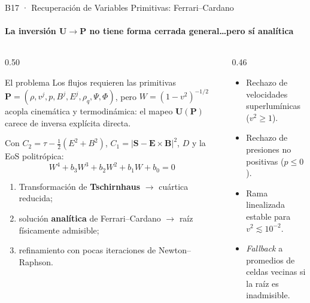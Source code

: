 \documentclass[aspectratio=169,9pt]{beamer}
\begin{document}
\begin{frame}{B17 · Recuperaci\'on de Variables Primitivas: Ferrari--Cardano}
\framesubtitle{La inversi\'on $\mathbf U\to\mathbf P$ no tiene forma cerrada general\ldots pero s\'i anal\'itica}
\begin{columns}[T]
\begin{column}{0.50\textwidth}
  \begin{block}{El problema}
    \scriptsize
    Los flujos requieren las primitivas
    $\mathbf P=(\rho,v^j,p,B^j,E^j,\rho_q,\Psi,\Phi)$, pero $W=(1-v^2)^{-1/2}$
    acopla cinem\'atica y termodin\'amica: el mapeo $\mathbf U(\mathbf P)$
    carece de inversa expl\'icita directa.
  \end{block}
  \begin{tcolorbox}[EQ={Reducci\'on a una cu\'artica en $W$}]
    \scriptsize
    Con $C_2=\tau-\tfrac12(E^2+B^2)$,\;
    $C_1=|\mathbf S-\mathbf E\times\mathbf B|^2$,\; $D$ y la EoS politr\'opica:
    \[
      W^4+b_3W^3+b_2W^2+b_1W+b_0=0
    \]
    \begin{enumerate}\setlength\itemsep{1pt}
      \item Transformaci\'on de \textbf{Tschirnhaus} $\to$ cu\'artica reducida;
      \item soluci\'on \textbf{anal\'itica} de Ferrari--Cardano
            $\to$ ra\'iz f\'isicamente admisible;
      \item refinamiento con pocas iteraciones de Newton--Raphson.
    \end{enumerate}
  \end{tcolorbox}
\end{column}
\begin{column}{0.46\textwidth}
  \begin{tcolorbox}[WRN={Guardias f\'isicas del algoritmo}]
    \scriptsize
    \begin{itemize}\setlength\itemsep{2pt}
      \item Rechazo de velocidades superlum\'inicas ($v^2\ge1$).
      \item Rechazo de presiones no positivas ($p\le0$).
      \item Rama linealizada estable para $v^2\lesssim10^{-2}$.
      \item \textit{Fallback} a promedios de celdas vecinas si la ra\'iz
            es inadmisible.

\end{itemize}
\end{tcolorbox}
\end{column}
\end{columns}
\end{frame}
\end{document}
